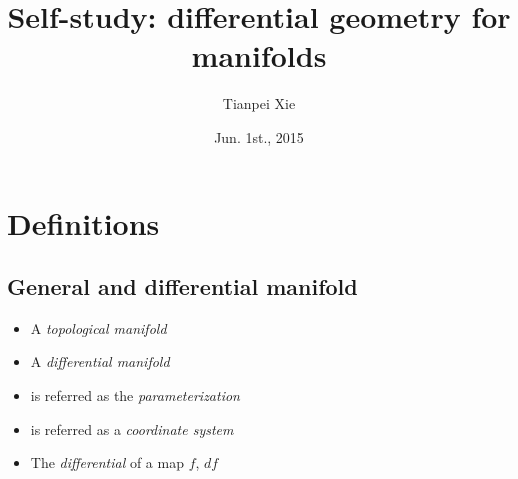 \documentclass[11pt]{article}
\begin{document}
\title{Self-study: differential geometry for manifolds}
\author{ Tianpei Xie}
\date{ Jun. 1st., 2015 }
\maketitle
\tableofcontents
\newpage
\section{Definitions}
\subsection{General and differential manifold}
\begin{itemize}
\item A \emph{topological manifold}\citep{munkres2000topology} \\


\item A \emph{differential manifold} \citep{guillemin2010differential}\\


\item is referred as the \emph{parameterization} \citep{guillemin2010differential} \\

\item is referred as a \emph{coordinate system} \citep{guillemin2010differential}\\ 

\item The \emph{differential} of a map $f$, $df$
\end{itemize}
\end{document}
